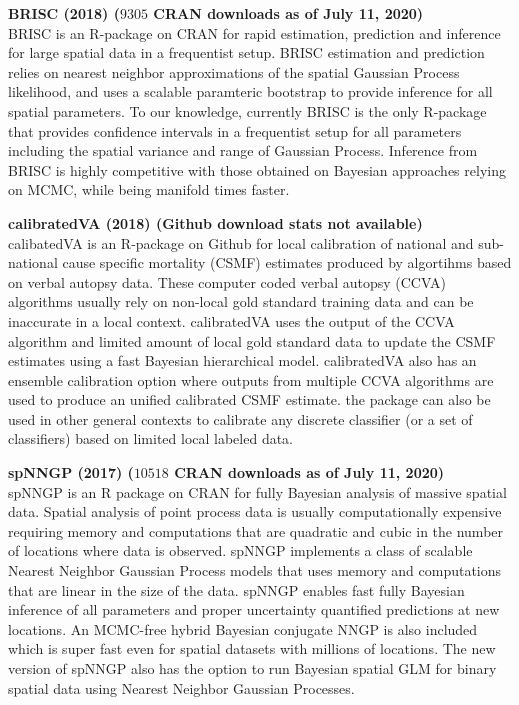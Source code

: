 \documentclass[10pt]{article}
\begin{document}
\item
{\bf BRISC (2018) ($9305$ CRAN downloads as of July 11, 2020)} \\
BRISC is an R-package on CRAN for rapid estimation, prediction and inference for large spatial data in a frequentist setup. BRISC estimation and prediction relies on nearest neighbor approximations of the spatial Gaussian Process likelihood, and uses a scalable paramteric bootstrap to provide inference for all spatial parameters. To our knowledge, currently BRISC is the only R-package that provides confidence intervals in a frequentist setup for all parameters including the spatial variance and range of Gaussian Process. Inference from BRISC is highly competitive with those obtained on Bayesian approaches relying on MCMC, while being manifold times faster.
\item
{\bf calibratedVA (2018) (Github download stats not available)}\\ %
calibatedVA is an R-package on Github for local calibration of national and sub-national cause specific mortality (CSMF) estimates produced by algortihms based on verbal autopsy data. These computer coded verbal autopsy (CCVA) algorithms usually rely on non-local gold standard training data and can be inaccurate in a local context. calibratedVA uses the output of the CCVA algorithm and limited amount of local gold standard data to update the CSMF estimates using a fast Bayesian hierarchical model. calibratedVA also has an ensemble calibration option where outputs from multiple CCVA algorithms are used to produce an unified calibrated CSMF estimate. the package can also be used in other general contexts to calibrate any discrete classifier (or a set of classifiers) based on limited local labeled data.
\item 
{\bf spNNGP (2017) ($10518$ CRAN downloads as of July 11, 2020)} \\%
spNNGP is an R package on CRAN for fully Bayesian analysis of massive spatial data. Spatial analysis of point process data is usually computationally expensive requiring memory and computations that are quadratic and cubic in the number of locations where data is observed. spNNGP implements a class of scalable Nearest Neighbor Gaussian Process models that uses memory and computations that are linear in the size of the data. spNNGP enables fast fully Bayesian inference of all parameters and proper uncertainty quantified predictions at new locations. An MCMC-free hybrid Bayesian conjugate NNGP is also included which is super fast even for spatial datasets with millions of locations. The new version of spNNGP also has the option to run Bayesian spatial GLM for binary spatial data using Nearest Neighbor Gaussian Processes. 
\end{document}
